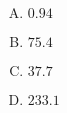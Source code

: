 \documentclass[12pt,letterpaper]{exam}
\begin{document}
\begin{questions}
\begin{enumerate}[A.]
\item $0.94$ 
\item $75.4$
\item $37.7$
\item $233.1$
\end{enumerate}


\end{questions}
\end{document}
